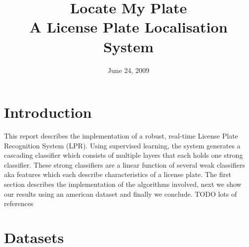 \documentclass[a4paper,11pt]{article}
\title{Locate My Plate \\ A License Plate Localisation System}
\date{June 24, 2009}
\begin{document}
\maketitle
\section*{Introduction}
This report describes the implementation of a robust, real-time License Plate
Recognition System (LPR). Using supervised learning, the system generates a
cascading classifier which consists of multiple layers that each holds one
strong classifier. These strong classifiers are a linear function of several
weak classifiers aka features which each describe characteristics of a license
plate. The first section describes the implementation of the algorithms
involved, next we show our results using an american dataset and finally we
conclude. \cite{zhang2006lbl}
TODO lots of references

\section*{Datasets}
\end{document}
